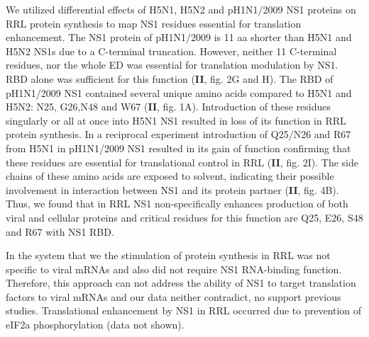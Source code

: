 		We utilized differential effects of H5N1, H5N2 and pH1N1/2009 NS1 proteins on RRL protein synthesis to map NS1 residues essential for translation enhancement. The NS1 protein of pH1N1/2009 is 11 \gls{aa} shorter than H5N1 and H5N2 \glspl{NS1} due to a C-terminal truncation. However, neither 11 C-terminal residues, nor the whole \gls{ED} was essential for translation modulation by \gls{NS1}. RBD alone was sufficient for this function (\textbf{II}, fig. 2G and H). The RBD of pH1N1/2009 NS1 contained several unique amino acids compared to H5N1 and H5N2: N25, G26,N48 and W67 (\textbf{II}, fig. 1A). Introduction of these residues singularly or all at once into H5N1 NS1 resulted in loss of its function in RRL protein synthesis. In a reciprocal experiment introduction of Q25/N26 and R67 from H5N1 in pH1N1/2009 NS1 resulted in its gain of function confirming that these residues are essential for translational control in RRL (\textbf{II}, fig. 2I). The side chains of these amino acids are exposed to solvent, indicating their possible involvement in interaction between NS1 and its protein partner (\textbf{II}, fig. 4B). Thus, we found that in \gls{RRL} NS1 non-specifically enhances production of both viral and cellular proteins and critical residues for this function are Q25, E26, S48 and R67 with \gls{NS1} \gls{RBD}.
		
		In the system that we the stimulation of protein synthesis in \gls{RRL} was not specific to viral mRNAs and also did not require NS1 RNA-binding function. Therefore, this approach can not address the ability of NS1 to target translation factors to viral mRNAs and our data neither contradict, no support previous studies. Translational enhancement by NS1 in RRL occurred due to prevention of \gls{eIF2a} phosphorylation (data not shown). 
		
